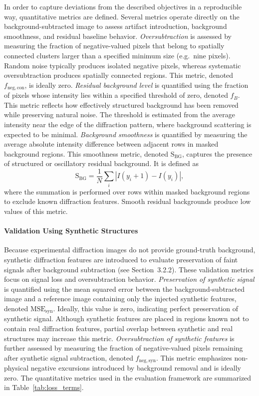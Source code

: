 \documentclass[iucr]{iucrjournals}
\begin{document}
In order to capture deviations from the described objectives in a reproducible way, quantitative metrics are defined. Several metrics operate directly on the background-subtracted image to assess artifact introduction, background smoothness, and residual baseline behavior. \textit{Oversubtraction} is assessed by measuring the fraction of negative-valued pixels that belong to spatially connected clusters larger than a specified minimum size (e.g.\ nine pixels). Random noise typically produces isolated negative pixels, whereas systematic oversubtraction produces spatially connected regions. This metric, denoted $f_{\mathrm{neg,con}}$, is ideally zero. \textit{Residual background level} is quantified using the fraction of pixels whose intensity lies within a specified threshold of zero, denoted $f_{B}$. This metric reflects how effectively structured background has been removed while preserving natural noise. The threshold is estimated from the average intensity near the edge of the diffraction pattern, where background scattering is expected to be minimal. \textit{Background smoothness} is quantified by measuring the average absolute intensity difference between adjacent rows in masked background regions. This smoothness metric, denoted $\mathrm{S}_{\mathrm{BG}}$, captures the presence of structured or oscillatory residual background. It is defined as
\begin{equation}
\mathrm{S}_{\mathrm{BG}} =
\frac{1}{N} \sum_i \left| I(y_i + 1) - I(y_i) \right|,
\end{equation}
where the summation is performed over rows within masked background regions to exclude known diffraction features. Smooth residual backgrounds produce low values of this metric.

\paragraph{Validation Using Synthetic Structures}

Because experimental diffraction images do not provide ground-truth background, synthetic diffraction features are introduced to evaluate preservation of faint signals after background subtraction (see Section~3.2.2). These validation metrics focus on signal loss and oversubtraction behavior. \textit{Preservation of synthetic signal} is quantified using the mean squared error between the background-subtracted image and a reference image containing only the injected synthetic features, denoted $\mathrm{MSE}_{\mathrm{syn}}$. Ideally, this value is zero, indicating perfect preservation of synthetic signal. Although synthetic features are placed in regions known not to contain real diffraction features, partial overlap between synthetic and real structures may increase this metric. \textit{Oversubtraction of synthetic features} is further assessed by measuring the fraction of negative-valued pixels remaining after synthetic signal subtraction, denoted $f_{\mathrm{neg,syn}}$. This metric emphasizes non-physical negative excursions introduced by background removal and is ideally zero. The quantitative metrics used in the evaluation framework are summarized in Table~\ref{tab:loss_terms}.
\end{document}
